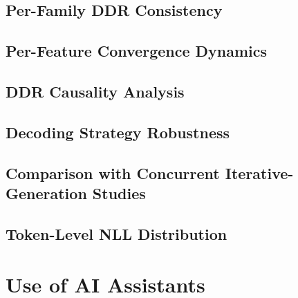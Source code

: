 \documentclass[11pt]{article}
\begin{document}
\subsection{Per-Family DDR Consistency}
\label{app:family-ddr}

\FloatBarrier

\subsection{Per-Feature Convergence Dynamics}
\label{app:convergence}


\subsection{DDR Causality Analysis}
\label{app:ddr-causality}




\subsection{Decoding Strategy Robustness}
\label{app:decoding-strategy}

\FloatBarrier



\subsection{Comparison with Concurrent Iterative-Generation Studies}
\label{app:iterative-comparison}


\subsection{Token-Level NLL Distribution}
\label{app:nll-distribution}

\FloatBarrier

\section{Use of AI Assistants}
\label{app:ai-assistants}

\end{document}
